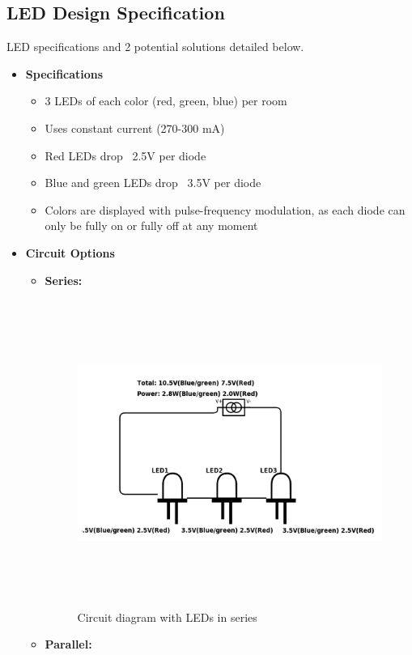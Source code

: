\documentclass[12pt]{article}
\begin{document}
{{{	\subsection{LED Design Specification}
	LED specifications and 2 potential solutions detailed below.
	
		{\renewcommand\labelitemi{}
			\begin{itemize}
				\item \textbf{Specifications}
					\begin{itemize}
						\item 3 LEDs of each color (red, green, blue) per room
						\item Uses constant current (270-300 mA)
						\item Red LEDs drop ~2.5V per diode
						\item Blue and green LEDs drop ~3.5V per diode
						\item Colors are displayed with pulse-frequency modulation, as each diode can only be fully on or fully off at any moment
					\end{itemize}
				\item \textbf{Circuit Options}
					\begin{itemize}
						\item \textbf{Series:}
							\begin{figure}[!htb]
								\centering
								\includegraphics[height = 100mm]{assets/SeriesLED.jpg}
								\caption{Circuit diagram with LEDs in series \label{overflow}}
							\end{figure}
						\item \textbf{Parallel:}

\end{itemize}
\end{itemize}}}}}
\end{document}
